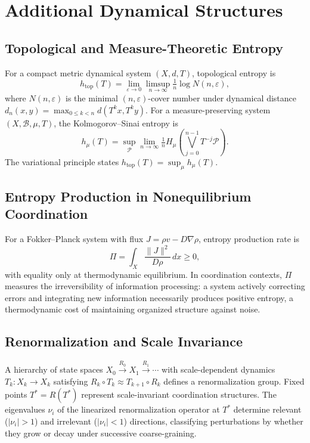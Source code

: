 \documentclass[12pt]{article}
\begin{document}
\section{Additional Dynamical Structures}

\subsection{Topological and Measure-Theoretic Entropy}

For a compact metric dynamical system $(X,d,T)$, topological entropy is
\[
h_{\mathrm{top}}(T) = \lim_{\varepsilon \to 0}\limsup_{n \to \infty} \tfrac{1}{n}\log N(n,\varepsilon),
\]
where $N(n,\varepsilon)$ is the minimal $(n,\varepsilon)$-cover number under dynamical distance $d_n(x,y) = \max_{0 \le k < n}d(T^k x, T^k y)$. For a measure-preserving system $(X,\mathcal{B},\mu,T)$, the Kolmogorov--Sinai entropy is
\[
h_\mu(T) = \sup_\mathcal{P} \lim_{n \to \infty} \tfrac{1}{n} H_\mu\!\left(\bigvee_{j=0}^{n-1}T^{-j}\mathcal{P}\right).
\]
The variational principle states $h_{\mathrm{top}}(T) = \sup_\mu h_\mu(T)$.

\subsection{Entropy Production in Nonequilibrium Coordination}

For a Fokker--Planck system with flux $J = \rho v - D\nabla\rho$, entropy production rate is
\[
\Pi = \int_X \frac{\|J\|^2}{D\rho}\,dx \ge 0,
\]
with equality only at thermodynamic equilibrium. In coordination contexts, $\Pi$ measures the irreversibility of information processing: a system actively correcting errors and integrating new information necessarily produces positive entropy, a thermodynamic cost of maintaining organized structure against noise.

\subsection{Renormalization and Scale Invariance}

A hierarchy of state spaces $X_0 \xrightarrow{R_0} X_1 \xrightarrow{R_1} \cdots$ with scale-dependent dynamics $T_k : X_k \to X_k$ satisfying $R_k \circ T_k \approx T_{k+1} \circ R_k$ defines a renormalization group. Fixed points $T^* = R(T^*)$ represent scale-invariant coordination structures. The eigenvalues $\nu_i$ of the linearized renormalization operator at $T^*$ determine relevant ($|\nu_i|>1$) and irrelevant ($|\nu_i|<1$) directions, classifying perturbations by whether they grow or decay under successive coarse-graining.
\end{document}
